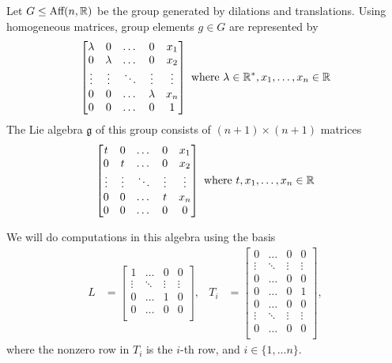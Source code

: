\documentclass{article}
\theoremstyle{definition}
\theoremstyle{remark}
\begin{document}
Let $G \leq \textup{Aff}(n, \mathbb{R})$ be the group generated by dilations and translations. Using homogeneous matrices, group elements $g\in G$ are represented by 
\begin{equation*}
    \begin{bmatrix}
        \lambda & 0 & \dots & 0 & x_1 \\
        0 &   \lambda & \dots & 0 & x_2 \\
        \vdots   &   \vdots  & \ddots & \vdots & \vdots \\
        0 &   0 & \dots & \lambda & x_n \\
        0 &   0 & \dots & 0 & 1 \\
    \end{bmatrix} \textup{ where } \lambda\in \mathbb{R}^{*}, x_1, \dots, x_n \in \mathbb{R}
\end{equation*}
The Lie algebra $\mathfrak{g}$ of this group consists of $(n+1) \times (n+1)$ matrices
\begin{equation*}
    \begin{bmatrix}
        t & 0 & \dots & 0 & x_1 \\
        0 &   t & \dots & 0 & x_2 \\
        \vdots   &   \vdots  & \ddots & \vdots & \vdots \\
        0 &   0 & \dots & t & x_n \\
        0 &   0 & \dots & 0 & 0 \\
    \end{bmatrix} \textup{ where } t, x_1, \dots, x_n \in \mathbb{R}
\end{equation*}

We will do computations in this algebra using the basis 
\begin{equation*}
\begin{array}{clcl}
L &=   \begin{bmatrix}
        1 &\dots &  0 & 0\\
         \vdots & \ddots & \vdots & \vdots\\
        0 &\dots &  1 & 0\\
        0 &\dots &  0 & 0\\
\end{bmatrix}, &
    T_i  &= \begin{bmatrix}
        0 &\dots &  0 & 0 \\
         \vdots & \ddots & \vdots & \vdots\\
        0 &\dots &  0 & 0 \\
        0 &\dots &  0 & 1\\
        0 &\dots &  0 & 0 \\
         \vdots & \ddots & \vdots & \vdots\\
                     0 &\dots &  0 & 0 \\
    \end{bmatrix},
\end{array}
\end{equation*}
where the nonzero row in $T_i$ is the $i$-th row, and $i\in \{1, \dots n\}$.  
\end{document}
